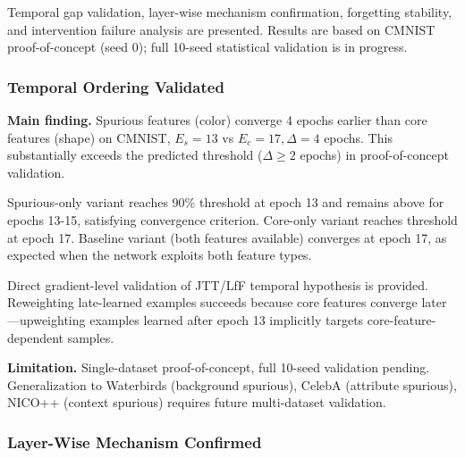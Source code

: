 
Temporal gap validation, layer-wise mechanism confirmation, forgetting stability, and intervention failure analysis are presented. Results are based on CMNIST proof-of-concept (seed 0); full 10-seed statistical validation is in progress.

\subsubsection{Temporal Ordering Validated}

\textbf{Main finding.} Spurious features (color) converge 4 epochs earlier than core features (shape) on CMNIST, $E_s = 13$ vs $E_c = 17, \Delta = 4$ epochs. This substantially exceeds the predicted threshold ($\Delta \geq 2$ epochs) in proof-of-concept validation.

\begin{table}[htbp]
\centering
{}
\end{table}

Spurious-only variant reaches 90\% threshold at epoch 13 and remains above for epochs 13-15, satisfying convergence criterion. Core-only variant reaches threshold at epoch 17. Baseline variant (both features available) converges at epoch 17, as expected when the network exploits both feature types.

Direct gradient-level validation of JTT/LfF temporal hypothesis is provided. Reweighting late-learned examples succeeds because core features converge later---upweighting examples learned after epoch 13 implicitly targets core-feature-dependent samples.

\textbf{Limitation.} Single-dataset proof-of-concept, full 10-seed validation pending. Generalization to Waterbirds (background spurious), CelebA (attribute spurious), NICO++ (context spurious) requires future multi-dataset validation.

\subsubsection{Layer-Wise Mechanism Confirmed}

